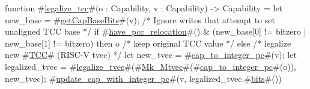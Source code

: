 function #\hyperref[sailRISCVzlegalizzezytcc]{legalize\_tcc}#(o : Capability, v : Capability) -> Capability = {
  let new_base = #\hyperref[sailRISCVzgetCapBaseBits]{getCapBaseBits}#(v);
  /* Ignore writes that attempt to set unaligned TCC base */
  if #\hyperref[sailRISCVzhavezypcczyrelocation]{have\_pcc\_relocation}#() & (new_base[0] != bitzero | new_base[1] != bitzero) then
    o /* keep original TCC value */
  else {
    /* legalize new #\hyperref[sailRISCVzTCC]{TCC}# (RISC-V tvec) */
    let new_tvec = #\hyperref[sailRISCVzcapzytozyintegerzypc]{cap\_to\_integer\_pc}#(v);
    let legalized_tvec = #\hyperref[sailRISCVzlegalizzezytvec]{legalize\_tvec}#(#\hyperref[sailRISCVzMkzyMtvec]{Mk\_Mtvec}#(#\hyperref[sailRISCVzcapzytozyintegerzypc]{cap\_to\_integer\_pc}#(o)), new_tvec);
    #\hyperref[sailRISCVzupdatezycapzywithzyintegerzypc]{update\_cap\_with\_integer\_pc}#(v, legalized_tvec.#\hyperref[sailRISCVzbits]{bits}#())
  }
}
